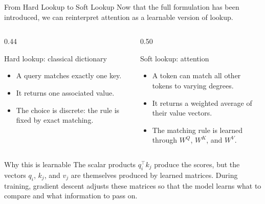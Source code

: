 \documentclass[aspectratio=169]{beamer}
\begin{document}
%
%
\begin{frame}{From Hard Lookup to Soft Lookup}
\small
  Now that the full formulation has been introduced, we can reinterpret attention as a
  learnable version of lookup.
  \vspace{-.5cm}
  \begin{columns}[t]
    \begin{column}{0.44\textwidth}
      \begin{block}{Hard lookup: classical dictionary}
        \begin{itemize}
          \item A query matches exactly one key.
          \item It returns one associated value.
          \item The choice is discrete: the rule is fixed by exact matching.
        \end{itemize}
      \end{block}
    \end{column}
    \begin{column}{0.50\textwidth}
      \begin{block}{Soft lookup: attention}
        \begin{itemize}
          \item A token can match all other tokens to varying degrees.
          \item It returns a weighted average of their value vectors.
          \item The matching rule is learned through $W^Q$, $W^K$, and $W^V$.
        \end{itemize}
      \end{block}
    \end{column}
  \end{columns}

  \begin{block}{Why this is learnable}
    The scalar products $q_i^\top k_j$ produce the scores, but the vectors $q_i$,
    $k_j$, and $v_j$ are themselves produced by learned matrices.  During training,
    gradient descent adjusts these matrices so that the model learns what to compare
    and what information to pass on.
  \end{block}
\end{frame}
%
%
\end{document}
